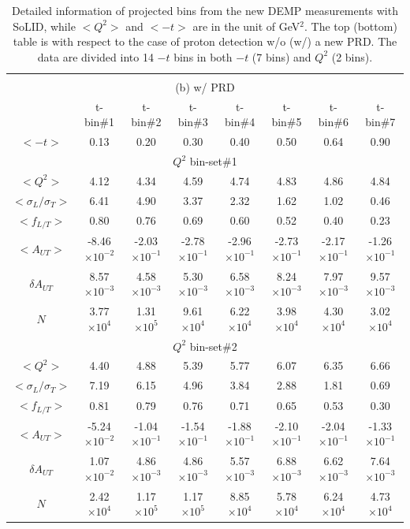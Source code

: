 \begin{table}[!ht]
\begin{tabular}{|c|c|c|c|c|c|c|c|}
\hline
\multicolumn{8}{c}{} \\
\multicolumn{8}{c}{ (b) w/ PRD} \\
\hline
	     &  t-bin\#1 & t-bin\#2 & t-bin\#3 & t-bin\#4 & t-bin\#5 & t-bin\#6 & t-bin\#7 \\
\hline 
$<-t>$       &  0.13 & 0.20   & 0.30   & 0.40   & 0.50   & 0.64   & 0.90  \\
\hline
\multicolumn{8}{|c|}{$Q^{2}$ bin-set\#1 } \\
\hline
$<Q^{2}>$   &  4.12 &  4.34 & 4.59 & 4.74 & 4.83 & 4.86 & 4.84 \\
$<\sigma_{L}/\sigma_{T}>$&  6.41 &  4.90 & 3.37 & 2.32 & 1.62 & 1.02 & 0.46 \\
$<f_{L/T}>$   &  0.80 &  0.76 & 0.69 & 0.60 & 0.52 & 0.40 & 0.23 \\
$<A_{UT}>$ &  -8.46$\times 10^{-2}$ &  -2.03$\times 10^{-1}$ & -2.78$\times 10^{-1}$ & 
-2.96$\times 10^{-1}$ & -2.73$\times 10^{-1}$ & -2.17$\times 10^{-1}$ & -1.26$\times 10^{-1}$ \\
$\delta A_{UT}$&  8.57$\times 10^{-3}$ &  4.58$\times 10^{-3}$ & 5.30$\times 10^{-3}$ & 
6.58$\times 10^{-3}$ & 8.24$\times 10^{-3}$ & 7.97$\times 10^{-3}$ & 9.57$\times 10^{-3}$ \\
$N$     &  3.77$\times 10^{4}$ &  1.31$\times 10^{5}$ & 9.61$\times 10^{4}$ &
6.22$\times 10^{4}$ & 3.98$\times 10^{4}$ & 4.30$\times 10^{4}$ & 3.02$\times 10^{4}$ \\   
\hline
\multicolumn{8}{|c|}{$Q^{2}$ bin-set\#2 } \\
\hline 
$<Q^{2}>$   &  4.40 &  4.88 & 5.39 & 5.77 & 6.07 & 6.35 & 6.66 \\
$<\sigma_{L}/\sigma_{T}>$   &  7.19 &  6.15 & 4.96 & 3.84 & 2.88 & 1.81 & 0.69 \\
$<f_{L/T}>$  &  0.81 &  0.79 & 0.76 & 0.71 & 0.65 & 0.53 & 0.30 \\
$<A_{UT}>$   &  -5.24$\times 10^{-2}$ &  -1.04$\times 10^{-1}$ & -1.54$\times 10^{-1}$ 
& -1.88$\times 10^{-1}$ & -2.10$\times 10^{-1}$ & -2.04$\times 10^{-1}$ & -1.33$\times 10^{-1}$ \\
$\delta A_{UT}$&  1.07$\times 10^{-2}$ &  4.86$\times 10^{-3}$ & 4.86$\times 10^{-3}$ & 
5.57$\times 10^{-3}$ & 6.88$\times 10^{-3}$ & 6.62$\times 10^{-3}$ & 7.64$\times 10^{-3}$ \\
$N$         &  2.42$\times 10^{4}$ &  1.17$\times 10^{5}$ & 1.17$\times 10^{5}$& 8.85$\times 10^{4}$ 
& 5.78$\times 10^{4}$ & 6.24$\times 10^{4}$ & 4.73$\times 10^{4}$ \\
\hline
\end{tabular}
\caption[Detailed information of projected bins]{\footnotesize{Detailed
information of projected bins from the new DEMP measurements with SoLID, while
$<Q^{2}>$ and $<-t>$ are in the unit of GeV$^{2}$. The top (bottom) table is
with respect to the case of proton detection w/o (w/) a new PRD. The data are
divided into 14 $-t$ bins in both $-t$ (7 bins) and $Q^{2}$ (2 bins).}}
\label{asym_bin_table_prd}
\end{table} 


